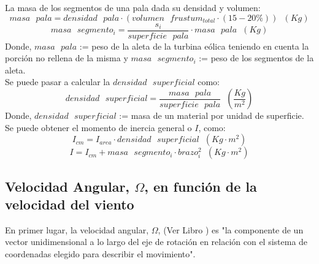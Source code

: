 La masa de los segmentos de una pala dada su densidad y volumen:
 \begin{equation}
 masa \text{ } pala = densidad \text{ } pala \cdot (volumen \text{ } frustum_{total} \cdot (15-20\%) ) \hspace{7pt} (Kg)
 \end{equation}
 \begin{equation}
 masa \text{ } segmento_i = \dfrac{s_i}{superficie \text{ } pala} \cdot masa \text{ } pala \hspace{7pt} (Kg)
 \label{def:masa_pala} 
 \end{equation}
  Donde, $ masa \text{ } pala $ := peso de la aleta de la turbina eólica teniendo en cuenta la porción no rellena de la misma y $ masa \text{ } segmento_i $ := peso de los segmentos de la aleta.\\
 
Se puede pasar a calcular la $densidad \text{ } superficial$ como:
  \begin{equation}
 densidad \text{ } superficial = \dfrac{masa \text{ } pala}{ superficie \text{ } pala} \hspace{7pt} \left(\dfrac{Kg}{m^2}\right)
 \label{def:densidad_superficial}
 \end{equation}
 Donde, $ densidad \text{ } superficial $ := masa de un material por unidad de superficie. \\
 
Se puede obtener el momento de inercia general o $I$, como:
  \begin{equation}
I_{cm} = I_{area} \cdot densidad \text{ } superficial \hspace{7pt} (Kg \cdot m^2)
 \label{def:momento_inercia_cm}
 \end{equation}
 \begin{equation}
I = I_{cm} + masa \text{ } segmento_i \cdot brazo_i^2 \hspace{7pt} (Kg \cdot m^2)
 \label{def:momento_inercia_general}
 \end{equation}

 
\subsection{Velocidad Angular, $\Omega$, en función de la velocidad del viento }

En primer lugar, la velocidad angular, $\Omega$, (Ver Libro \cite[p.~303]{cummings2004understanding}) es "la componente de un vector unidimensional a lo largo del eje de rotación en relación con el sistema de coordenadas elegido para describir el movimiento".\\

